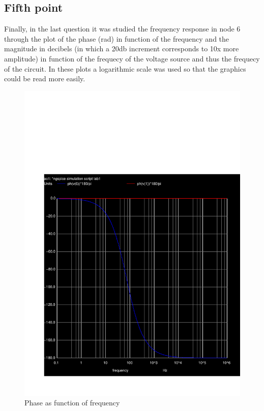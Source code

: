 \subsection{Fifth point}
\label{ssec:5S}

\par Finally, in the last question it was studied the frequency response in node 6 through the plot of the phase (rad) in function of the frequency and the magnitude in decibels (in which a 20db increment corresponds to 10x more amplitude) in function of the frequecy of the voltage source and thus the frequecy of the circuit. In these plots a logarithmic scale was used so that the graphics could be read more easily. 

\begin{figure}[h] \centering
\includegraphics[width=0.6\linewidth]{teste_5_p.pdf}
\caption{Phase as function of frequency}
\label{fig:Ph(v(1))*180/pi Ph(v(6))*180/pi}
\end{figure}

